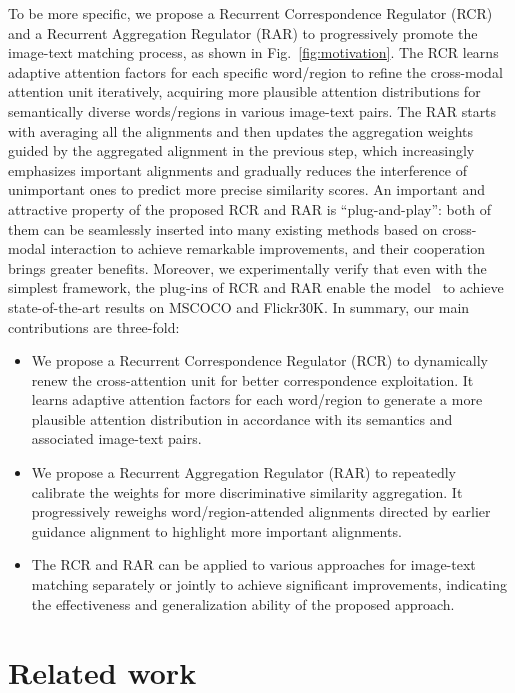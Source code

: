 \documentclass[journal]{IEEEtran}\newcommand{\ignore}[1]{}
\begin{document}
To be more specific, we propose a Recurrent Correspondence Regulator (RCR) and a Recurrent Aggregation Regulator (RAR) to progressively promote the image-text matching process, as shown in Fig.~\ref{fig:motivation}. The RCR learns adaptive attention factors for each specific word/region to refine the cross-modal attention unit iteratively, acquiring more plausible attention distributions for semantically diverse words/regions in various image-text pairs. The RAR starts with averaging all the alignments and then updates the aggregation weights guided by the aggregated alignment in the previous step, which increasingly emphasizes important alignments and gradually reduces the interference of unimportant ones to predict more precise similarity scores. An important and attractive property of the proposed RCR and RAR is “plug-and-play”: both of them can be seamlessly inserted into many existing methods based on cross-modal interaction to achieve remarkable improvements, and their cooperation brings greater benefits. Moreover, we experimentally verify that even with the simplest framework, the plug-ins of RCR and RAR enable the model~\cite{SCAN} to achieve state-of-the-art results on MSCOCO and Flickr30K.
In summary, our main contributions are three-fold:
\begin{itemize}
	\item We propose a Recurrent Correspondence Regulator (RCR) to dynamically renew the cross-attention unit for better correspondence exploitation. It learns adaptive attention factors for each word/region to generate a more plausible attention distribution in accordance with its semantics and associated image-text pairs.
	\item We propose a Recurrent Aggregation Regulator (RAR) to repeatedly calibrate the weights for more discriminative similarity aggregation. It progressively reweighs word/region-attended alignments directed by earlier guidance alignment to highlight more important alignments.
	\item The RCR and RAR can be applied to various approaches for image-text matching separately or jointly to achieve significant improvements, indicating the effectiveness and generalization ability of the proposed approach.
\end{itemize}


\section{Related work}
\end{document}
